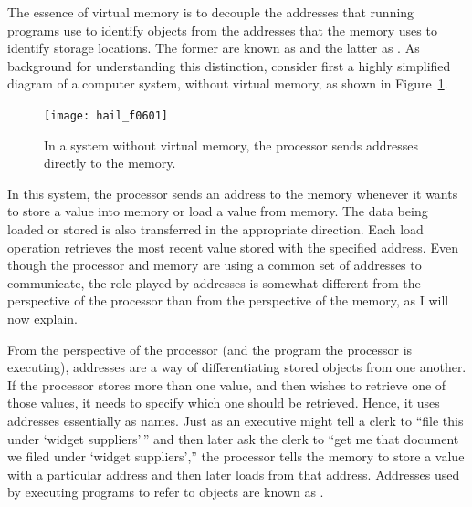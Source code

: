 The essence of virtual memory is to decouple the addresses that
running programs use to identify objects from the addresses that the
memory uses to identify storage locations.  The former are known as
 and the latter as .  As background for understanding this distinction, consider first
a highly simplified diagram of a computer system, without virtual
memory, as shown in Figure~\ref{PM-diagram}.
\begin{figure}
\centerline{\texttt{[image: hail\_f0601]}}

\caption{In a system without virtual memory, the processor sends addresses directly
  to the memory.}
\label{PM-diagram}
\end{figure}
In this system, the processor sends an address to the memory whenever
it wants to store a value into memory or load a value from memory.
The data being loaded or stored is also transferred in the appropriate
direction.  Each load operation retrieves the most recent value stored
with the specified address.  Even though the processor and
memory are using a common set of addresses to communicate, the role
played by addresses is somewhat different from the perspective of the
processor than from the perspective of the memory, as I will now
explain.

From the perspective of the processor (and the program the processor
is executing), addresses are a way of differentiating stored objects
from one another.  If the processor stores more than one value, and
then wishes to retrieve one of those values, it needs to specify which
one should be retrieved.  Hence, it uses addresses essentially as
names.  Just as an executive might tell a clerk to ``file this under
`widget suppliers'\,'' and then later ask the clerk to ``get me that
document we filed under `widget suppliers','' the processor tells the
memory to store a value with a particular address and then later
loads from that address.  Addresses used by executing programs to refer to objects are known as
.

